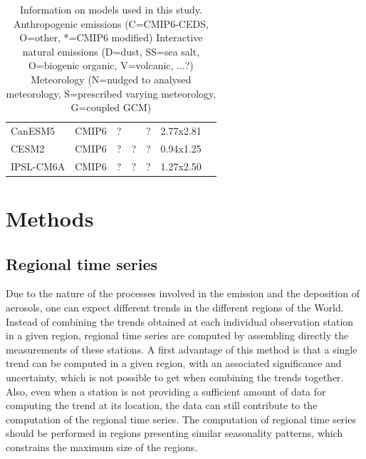 \documentclass[journal abbreviation, manuscript]{copernicus}
\begin{document}
\begin{table}[]
\begin{tabularx}{\textwidth}{llllllX}
CanESM5    & CMIP6     & ?                             &                         & ?           & 2.77x2.81                   & \cite{gmd-12-4823-2019}                                             \\
CESM2      & CMIP6     & ?                             & ?                       & ?           & 0.94x1.25                   &                                                                      \\
IPSL-CM6A  & CMIP6     & ?                             & ?                       & ?           & 1.27x2.50                   &                                                                      \\ \bottomrule
\end{tabularx}
 \caption{Information on models used in this study. 
  Anthropogenic emissions (C=CMIP6-CEDS, O=other, *=CMIP6 modified)
  Interactive natural emissions (D=dust, SS=sea salt, O=biogenic organic, V=volcanic, ...?)
  Meteorology (N=nudged to analysed meteorology, S=prescribed varying meteorology, G=coupled GCM)
  }
 \label{table:models}
\end{table}



\section{Methods}

\subsection{Regional time series}
Due to the nature of the processes involved in the emission and the deposition of aerosols, one can expect different trends in the different regions of the World. Instead of combining the trends obtained at each individual observation station in a given region, regional time series are computed by assembling directly the measurements of these stations. A first advantage of this method is that a single trend can be computed in a given region, with an associated significance and uncertainty, which is not possible to get when combining the trends together. Also, even when a station is not providing a sufficient amount of data for computing the trend at its location, the data can still contribute to the computation of the regional time series. The computation of regional time series should be performed in regions presenting similar seasonality patterns, which constrains the maximum size of the regions.
\end{document}
